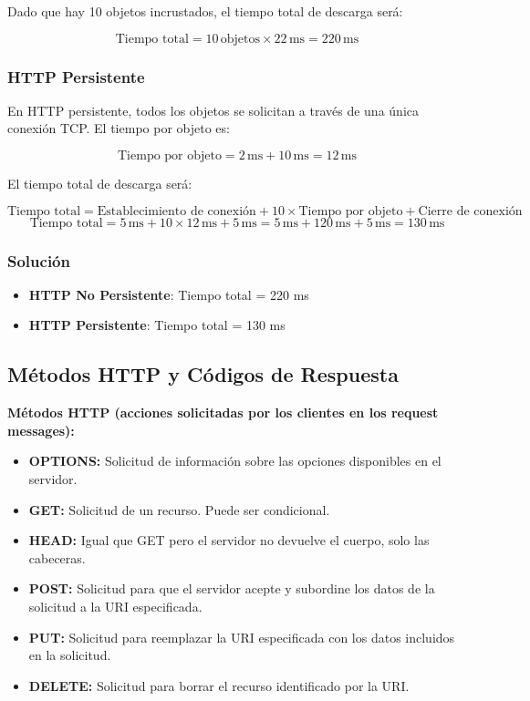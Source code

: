\documentclass[a4paper,12pt]{article}
\begin{document}
Dado que hay 10 objetos incrustados, el tiempo total de descarga será:

\[
\text{Tiempo total} = 10 \, \text{objetos} \times 22 \, \text{ms} = 220 \, \text{ms}
\]

\subsubsection{HTTP Persistente}
En HTTP persistente, todos los objetos se solicitan a través de una única conexión TCP. El tiempo por objeto es:

\[
\text{Tiempo por objeto} = 2 \, \text{ms} + 10 \, \text{ms} = 12 \, \text{ms}
\]

El tiempo total de descarga será:

\[
\text{Tiempo total} = \text{Establecimiento de conexión} + 10 \times \text{Tiempo por objeto} + \text{Cierre de conexión}
\]
\[
\text{Tiempo total} = 5 \, \text{ms} + 10 \times 12 \, \text{ms} + 5 \, \text{ms} = 5 \, \text{ms} + 120 \, \text{ms} + 5 \, \text{ms} = 130 \, \text{ms}
\]

\subsubsection{Solución}
\begin{itemize}
    \item \textbf{HTTP No Persistente}: Tiempo total = 220 ms
    \item \textbf{HTTP Persistente}: Tiempo total = 130 ms
\end{itemize}

\subsection{Métodos HTTP y Códigos de Respuesta}

\textbf{Métodos HTTP (acciones solicitadas por los clientes en los request messages):}
\begin{itemize}
    \item \textbf{OPTIONS:} Solicitud de información sobre las opciones disponibles en el servidor.
    \item \textbf{GET:} Solicitud de un recurso. Puede ser condicional.
    \item \textbf{HEAD:} Igual que GET pero el servidor no devuelve el cuerpo, solo las cabeceras.
    \item \textbf{POST:} Solicitud para que el servidor acepte y subordine los datos de la solicitud a la URI especificada.
    \item \textbf{PUT:} Solicitud para reemplazar la URI especificada con los datos incluidos en la solicitud.
    \item \textbf{DELETE:} Solicitud para borrar el recurso identificado por la URI.
\end{itemize}
\end{document}
